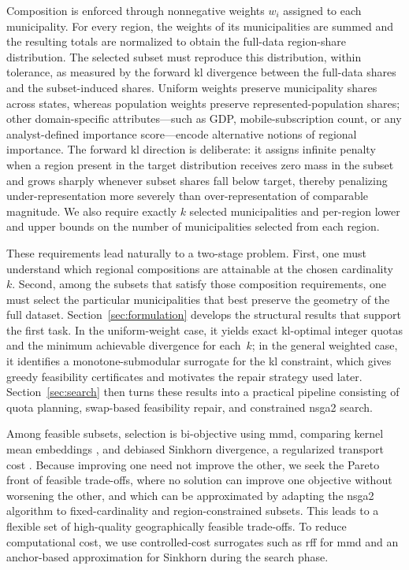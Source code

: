 \documentclass[10pt,journal]{IEEEtran}
\newcommand{\1}{\mathbf{1}}
\theoremstyle{ieeethm}
\begin{document}
Composition is enforced through nonnegative weights $w_i$ assigned to each municipality. For every region, the weights of its municipalities are summed and the resulting totals are normalized to obtain the full-data region-share distribution. The selected subset must reproduce this distribution, within tolerance, as measured by the forward \gls{kl} divergence between the full-data shares and the subset-induced shares. Uniform weights preserve municipality shares across states, whereas population weights preserve represented-population shares; other domain-specific attributes---such as GDP, mobile-subscription count, or any analyst-defined importance score---encode alternative notions of regional importance. The forward \gls{kl} direction is deliberate: it assigns infinite penalty when a region present in the target distribution receives zero mass in the subset and grows sharply whenever subset shares fall below target, thereby penalizing under-representation more severely than over-representation of comparable magnitude. We also require exactly $k$ selected municipalities and per-region lower and upper bounds on the number of municipalities selected from each region.

These requirements lead naturally to a two-stage problem. First, one must understand which regional compositions are attainable at the chosen cardinality~$k$. Second, among the subsets that satisfy those composition requirements, one must select the particular municipalities that best preserve the geometry of the full dataset. Section~\ref{sec:formulation} develops the structural results that support the first task. In the uniform-weight case, it yields exact \gls{kl}-optimal integer quotas and the minimum achievable divergence for each~$k$; in the general weighted case, it identifies a monotone-submodular surrogate for the \gls{kl} constraint, which gives greedy feasibility certificates and motivates the repair strategy used later. Section~\ref{sec:search} then turns these results into a practical pipeline consisting of quota planning, swap-based feasibility repair, and constrained \gls{nsga2} search.

Among feasible subsets, selection is bi-objective using \gls{mmd}, comparing kernel mean embeddings \cite{gretton2012kernel}, and debiased Sinkhorn divergence, a regularized transport cost \cite{cuturi2013sinkhorn,feydy2019sinkhorn}. Because improving one need not improve the other, we seek the Pareto front of feasible trade-offs, where no solution can improve one objective without worsening the other, and which can be approximated by adapting the \gls{nsga2} algorithm \cite{deb2002nsga2} to fixed-cardinality and region-constrained subsets. This leads to a flexible set of high-quality geographically feasible trade-offs. To reduce computational cost, we use controlled-cost surrogates such as \gls{rff} \cite{rahimi2007random} for \gls{mmd} and an anchor-based approximation \cite{cuturi2013sinkhorn} for Sinkhorn during the search phase.
\end{document}
